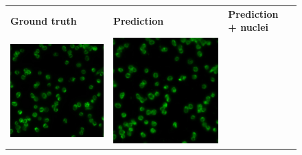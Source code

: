 \begin{figure}[H]
    \centering
    \centering
        \begin{tabularx}{\textwidth}{YYYY}
            \textbf{Ground truth} &
            \textbf{Prediction} &
            \textbf{Prediction + nuclei} \\
            \includegraphics{bilder/ER/gt.jpg} & \includegraphics{bilder/ER/er.jpg} &

\end{tabularx}
\end{figure}
